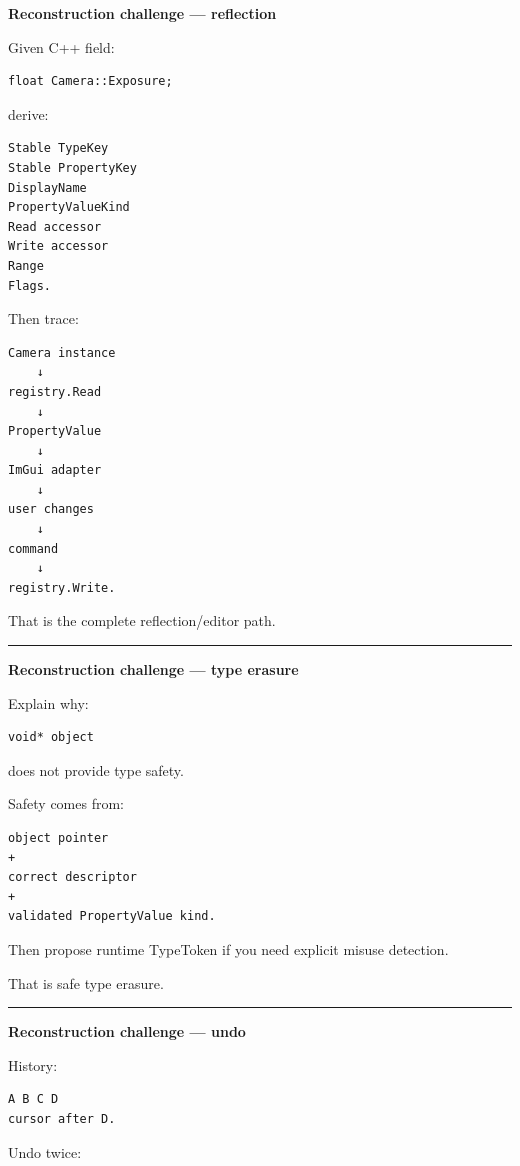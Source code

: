 \textbf{Reconstruction challenge --- reflection}

Given C++ field:

\begin{verbatim}
float Camera::Exposure;
\end{verbatim}

derive:

\begin{verbatim}
Stable TypeKey
Stable PropertyKey
DisplayName
PropertyValueKind
Read accessor
Write accessor
Range
Flags.
\end{verbatim}

Then trace:

\begin{verbatim}
Camera instance
    ↓
registry.Read
    ↓
PropertyValue
    ↓
ImGui adapter
    ↓
user changes
    ↓
command
    ↓
registry.Write.
\end{verbatim}

That is the complete reflection/editor path.

\begin{center}\rule{0.5\linewidth}{0.5pt}\end{center}

\textbf{Reconstruction challenge --- type erasure}

Explain why:

\begin{verbatim}
void* object
\end{verbatim}

does not provide type safety.

Safety comes from:

\begin{verbatim}
object pointer
+
correct descriptor
+
validated PropertyValue kind.
\end{verbatim}

Then propose runtime TypeToken if you need explicit misuse detection.

That is safe type erasure.

\begin{center}\rule{0.5\linewidth}{0.5pt}\end{center}

\textbf{Reconstruction challenge --- undo}

History:

\begin{verbatim}
A B C D
cursor after D.
\end{verbatim}

Undo twice:

